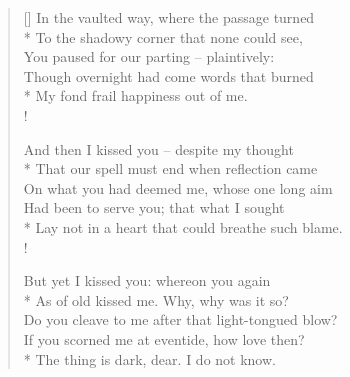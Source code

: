 \documentclass[MAIN]{subfiles}
\begin{document}
\settowidth{\versewidth}{\vin You paused for our parting -- plaintively:}
\begin{verse}[\versewidth]
In the vaulted way, where the passage turned\\*
\vin To the shadowy corner that none could see,\\
\vin You paused for our parting -- plaintively:\\
Though overnight had come words that burned\\*
\vin My fond frail happiness out of me.\\!

And then I kissed you -- despite my thought\\*
\vin That our spell must end when reflection came\\
\vin On what you had deemed me, whose one long aim\\
Had been to serve you; that what I sought\\*
\vin Lay not in a heart that could breathe such blame.\\!

But yet I kissed you: whereon you again\\*
\vin As of old kissed me. Why, why was it so?\\
\vin Do you cleave to me after that light-tongued blow?\\
If you scorned me at eventide, how love then?\\*
\vin The thing is dark, dear. I do not know.
\end{verse}
\end{document}
